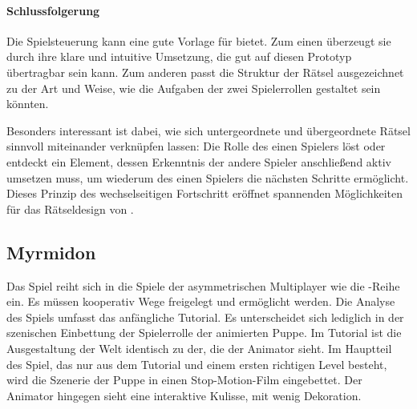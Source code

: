 \paragraph{Schlussfolgerung}
Die Spielsteuerung kann eine gute Vorlage für  bietet. Zum einen überzeugt sie durch ihre klare und intuitive Umsetzung, die gut auf diesen Prototyp übertragbar sein kann. Zum anderen passt die Struktur der Rätsel ausgezeichnet zu der Art und Weise, wie die Aufgaben der zwei Spielerrollen gestaltet sein könnten.

Besonders interessant ist dabei, wie sich untergeordnete und übergeordnete Rätsel sinnvoll miteinander verknüpfen lassen: Die Rolle des einen Spielers löst oder entdeckt ein Element, dessen Erkenntnis der andere Spieler anschließend aktiv umsetzen muss, um wiederum des einen Spielers die nächsten Schritte ermöglicht. Dieses Prinzip des wechselseitigen Fortschritt eröffnet spannenden Möglichkeiten für das Rätseldesign von .

\subsection{Myrmidon}
Das Spiel  reiht sich in die Spiele der asymmetrischen Multiplayer wie die -Reihe ein. Es müssen kooperativ Wege freigelegt und ermöglicht werden. Die Analyse des Spiels umfasst das anfängliche Tutorial. Es unterscheidet sich lediglich in der szenischen Einbettung der Spielerrolle der animierten Puppe. Im Tutorial ist die Ausgestaltung der Welt identisch zu der, die der Animator sieht. Im Hauptteil des Spiel, das nur aus dem Tutorial und einem ersten richtigen Level besteht, wird die Szenerie der Puppe in einen Stop-Motion-Film eingebettet. Der Animator hingegen sieht eine interaktive Kulisse, mit wenig Dekoration.

